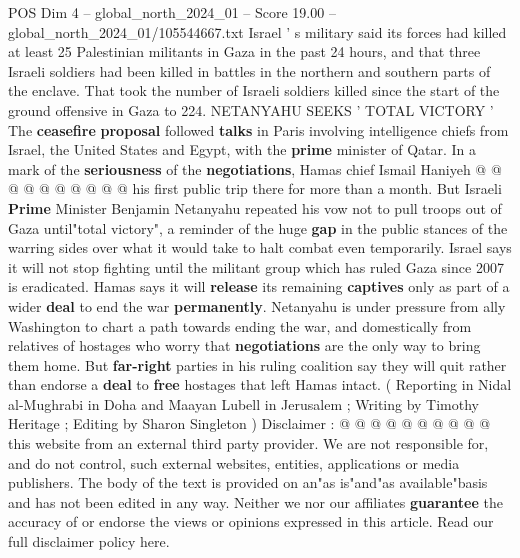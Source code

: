 \begin{textsample}{POS Dim 4 – global\_north\_2024\_01 – Score 19.00 – global\_north\_2024\_01/105544667.txt}
Israel ' s military said its forces had killed at least 25 Palestinian militants in Gaza in the past 24 hours, and that three Israeli soldiers had been killed in battles in the northern and southern parts of the enclave.
That took the number of Israeli soldiers killed since the start of the ground offensive in Gaza to 224.
NETANYAHU SEEKS ' TOTAL VICTORY ' The \textbf{ceasefire} \textbf{proposal} followed \textbf{talks} in Paris involving intelligence chiefs from Israel, the United States and Egypt, with the \textbf{prime} minister of Qatar.
In a mark of the \textbf{seriousness} of the \textbf{negotiations}, Hamas chief Ismail Haniyeh @ @ @ @ @ @ @ @ @ @ his first public trip there for more than a month.
But Israeli \textbf{Prime} Minister Benjamin Netanyahu repeated his vow not to pull troops out of Gaza until"total victory", a reminder of the huge \textbf{gap} in the public stances of the warring sides over what it would take to halt combat even temporarily.
Israel says it will not stop fighting until the militant group which has ruled Gaza since 2007 is eradicated.
Hamas says it will \textbf{release} its remaining \textbf{captives} only as part of a wider \textbf{deal} to end the war \textbf{permanently}.
Netanyahu is under pressure from ally Washington to chart a path towards ending the war, and domestically from relatives of hostages who worry that \textbf{negotiations} are the only way to bring them home.
But \textbf{far-right} parties in his ruling coalition say they will quit rather than endorse a \textbf{deal} to \textbf{free} hostages that left Hamas intact. ( Reporting in Nidal al-Mughrabi in Doha and Maayan Lubell in Jerusalem ; Writing by Timothy Heritage ; Editing by Sharon Singleton ) Disclaimer : @ @ @ @ @ @ @ @ @ @ this website from an external third party provider.
We are not responsible for, and do not control, such external websites, entities, applications or media publishers.
The body of the text is provided on an"as is"and"as available"basis and has not been edited in any way.
Neither we nor our affiliates \textbf{guarantee} the accuracy of or endorse the views or opinions expressed in this article.
Read our full disclaimer policy here.

\end{textsample}
